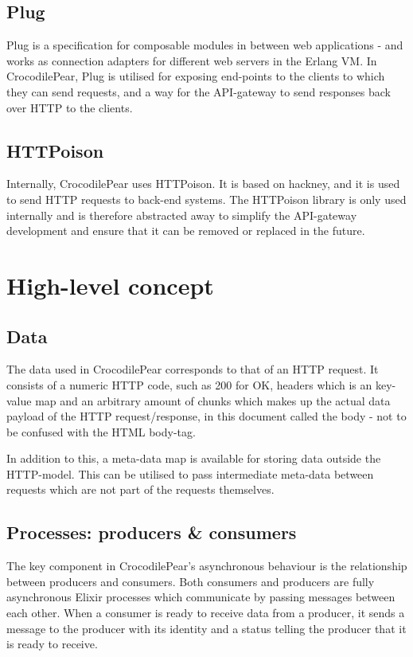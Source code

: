 \documentclass{cslthse-msc}
\begin{document}
\subsection{Plug}
Plug is a specification for composable modules in between web applications - and works as connection adapters for different web servers in the Erlang VM\cite{plug}. In CrocodilePear, Plug is utilised for exposing end-points to the clients to which they can send requests, and a way for the API-gateway to send responses back over HTTP to the clients.

\subsection{HTTPoison}
Internally, CrocodilePear uses HTTPoison\cite{httpoison}. It is based on hackney\cite{hackney}, and it is used to send HTTP requests to back-end systems. The HTTPoison library is only used internally and is therefore abstracted away to simplify the API-gateway development and ensure that it can be removed or replaced in the future.

\section{High-level concept}

\subsection{Data}
The data used in CrocodilePear corresponds to that of an HTTP request. It consists of a numeric HTTP code, such as 200 for OK, headers which is an key-value map and an arbitrary amount of chunks which makes up the actual data payload of the HTTP request/response, in this document called the body - not to be confused with the HTML body-tag. 

In addition to this, a meta-data map is available for storing data outside the HTTP-model. This can be utilised to pass intermediate meta-data between requests which are not part of the requests themselves.

\subsection{Processes: producers \& consumers}
The key component in CrocodilePear's asynchronous behaviour is the relationship between producers and consumers. Both consumers and producers are fully asynchronous Elixir processes which communicate by passing messages between each other. When a consumer is ready to receive data from a producer, it sends a message to the producer with its identity and a status telling the producer that it is ready to receive.
\end{document}
